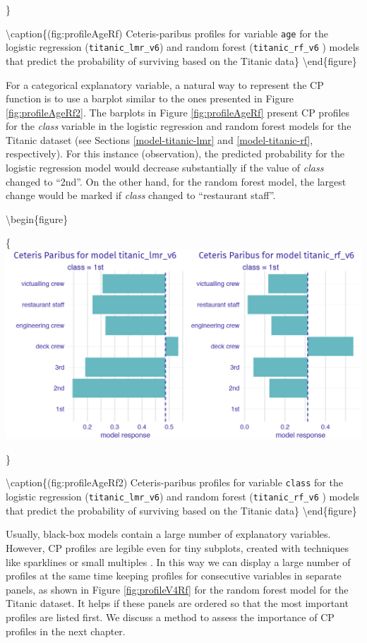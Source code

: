 \documentclass[12pt,]{krantz}
\theoremstyle{definition}
\theoremstyle{definition}
\theoremstyle{definition}
\theoremstyle{remark}
\begin{document}
\}

\textbackslash{}caption\{(fig:profileAgeRf) Ceteris-paribus profiles for
variable \texttt{age} for the logistic regression
(\texttt{titanic\_lmr\_v6}) and random forest (\texttt{titanic\_rf\_v6}
) models that predict the probability of surviving based on the Titanic
data\}\label{fig:profileAgeRf} \textbackslash{}end\{figure\}

For a categorical explanatory variable, a natural way to represent the
CP function is to use a barplot similar to the ones presented in Figure
\ref{fig:profileAgeRf2}. The barplots in Figure \ref{fig:profileAgeRf}
present CP profiles for the \emph{class} variable in the logistic
regression and random forest models for the Titanic dataset (see
Sections \ref{model-titanic-lmr} and \ref{model-titanic-rf},
respectively). For this instance (observation), the predicted
probability for the logistic regression model would decrease
substantially if the value of \emph{class} changed to ``2nd''. On the
other hand, for the random forest model, the largest change would be
marked if \emph{class} changed to ``restaurant staff''.

\textbackslash{}begin\{figure\}

\{\centering \includegraphics[width=0.7\linewidth]{figure/profile_class_rf}

\}

\textbackslash{}caption\{(fig:profileAgeRf2) Ceteris-paribus profiles
for variable \texttt{class} for the logistic regression
(\texttt{titanic\_lmr\_v6}) and random forest (\texttt{titanic\_rf\_v6}
) models that predict the probability of surviving based on the Titanic
data\}\label{fig:profileAgeRf2} \textbackslash{}end\{figure\}

Usually, black-box models contain a large number of explanatory
variables. However, CP profiles are legible even for tiny subplots,
created with techniques like sparklines or small multiples
\citep{Tufte1986}. In this way we can display a large number of profiles
at the same time keeping profiles for consecutive variables in separate
panels, as shown in Figure \ref{fig:profileV4Rf} for the random forest
model for the Titanic dataset. It helps if these panels are ordered so
that the most important profiles are listed first. We discuss a method
to assess the importance of CP profiles in the next chapter.
\end{document}
